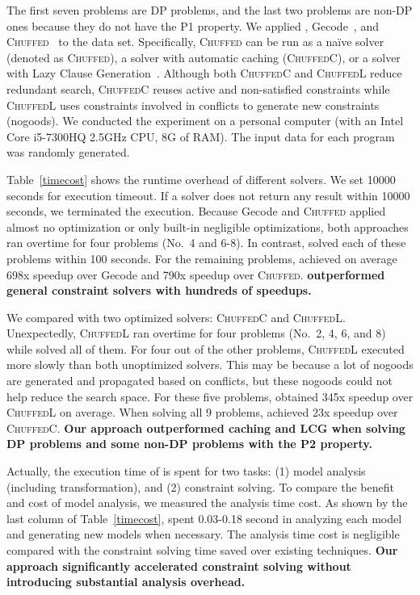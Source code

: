 The first seven problems are DP problems, and the last two problems are non-DP ones because they do not have the P1 property. 
We applied \tool, Gecode~\cite{schulte2006gecode}, and \textsc{Chuffed}~\cite{chu2012exploiting} to the data set. Specifically,
\textsc{Chuffed} can be run as a na\"ive solver (denoted as \textsc{Chuffed}), a solver with automatic caching (\textsc{ChuffedC}), or a solver with Lazy Clause Generation~\cite{ohrimenko2009propagation}. Although both \textsc{ChuffedC} and \textsc{ChuffedL} reduce redundant search, \textsc{ChuffedC} reuses active and non-satisfied constraints while \textsc{ChuffedL} uses constraints involved in conflicts to generate new constraints (nogoods). 
We conducted the experiment 
on a personal computer (with an Intel Core i5-7300HQ 2.5GHz CPU, 8G of RAM). The input data for each program was randomly generated. 

Table~\ref{timecost} shows the runtime overhead of different solvers. 
We set 10000 seconds for execution timeout. If a solver does not return any result within 10000 seconds, we terminated the execution. Because Gecode and \textsc{Chuffed} applied almost no optimization or only built-in negligible optimizations, both approaches ran overtime for four problems (No.~4 and 6-8). In contrast, \tool solved each of these problems within 100 seconds. 
For the remaining problems, \tool achieved on average 698x speedup over Gecode and 790x speedup over \textsc{Chuffed}. \textbf{\tool outperformed general constraint solvers with hundreds of speedups. }

We compared \tool with two optimized solvers: \textsc{ChuffedC} and \textsc{ChuffedL}. Unexpectedly, \textsc{ChuffedL} ran overtime for four problems (No.~2, 4, 6, and 8) while \tool solved all of them. 
For four out of the other problems, \textsc{ChuffedL} executed more slowly than both unoptimized solvers. This may be because a lot of nogoods are generated and propagated based on conflicts, but these nogoods could not help reduce the search space. 
For these five problems, \tool obtained 345x speedup over \textsc{ChuffedL} on average.
When solving all 9 problems, \tool achieved 23x speedup
over \textsc{ChuffedC}. %
\textbf{Our approach outperformed caching and LCG when solving DP problems and some non-DP problems with the P2 property.}

Actually, the execution time of \tool is spent for two tasks: (1) model analysis (including transformation), and (2) constraint solving. To compare the benefit and cost of model analysis, we measured the analysis time cost. 
As shown by the last column of Table~\ref{timecost}, \tool spent 0.03-0.18 second in analyzing each model and generating new models when necessary. The analysis time cost is negligible compared with the constraint solving time \tool saved over existing techniques. \textbf{Our approach significantly accelerated constraint solving without introducing substantial analysis overhead.}    
	
